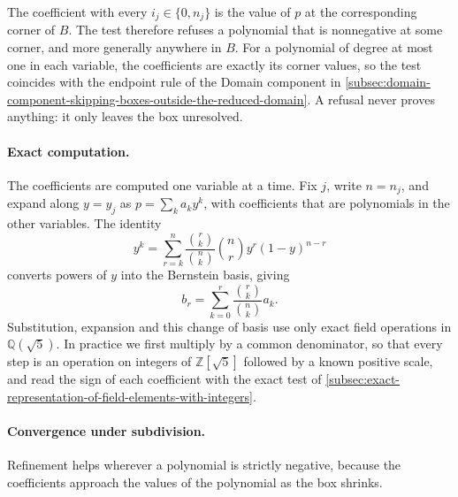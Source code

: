 The coefficient with every $i_j\in\{0,n_j\}$ is the value of $p$ at the
corresponding corner of $B$. The test therefore refuses a polynomial that
is nonnegative at some corner, and more generally anywhere in $B$. For a
polynomial of degree at most one in each variable, the coefficients are
exactly its corner values, so the test coincides with the endpoint rule of
the Domain component in
\cref{subsec:domain-component-skipping-boxes-outside-the-reduced-domain}.
A refusal never proves anything: it only leaves the box unresolved.

\paragraph{Exact computation.}
The coefficients are computed one variable at a time. Fix $j$, write
$n=n_j$, and expand along $y=y_j$ as
$p=\sum_ka_ky^k$, with coefficients that are polynomials in the other
variables. The identity
\[
  y^k=\sum_{r=k}^{n}\frac{\binom rk}{\binom nk}\binom nr y^r{(1-y)}^{n-r}
\]
converts powers of $y$ into the Bernstein basis, giving
\begin{equation}\label{eq:bernstein-from-power-coefficients}
  b_r=\sum_{k=0}^{r}\frac{\binom rk}{\binom nk}a_k .
\end{equation}
Substitution, expansion and this change of basis use only exact field
operations in $\mathbb Q(\sqrt5)$. In practice we first multiply by a
common denominator, so that every step is an operation on integers of
$\mathbb Z[\sqrt5]$ followed by a known positive scale, and read the sign
of each coefficient with the exact test of
\cref{subsec:exact-representation-of-field-elements-with-integers}.

\paragraph{Convergence under subdivision.}
Refinement helps wherever a polynomial is strictly negative, because the
coefficients approach the values of the polynomial as the box shrinks.

